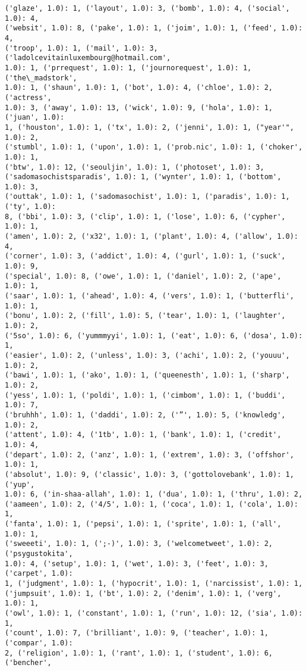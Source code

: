 \documentclass[11pt]{article}
\begin{document}
\begin{Verbatim}[commandchars=\\\{\}]
('glaze', 1.0): 1, ('layout', 1.0): 3, ('bomb', 1.0): 4, ('social', 1.0): 4,
('websit', 1.0): 8, ('pake', 1.0): 1, ('joim', 1.0): 1, ('feed', 1.0): 4,
('troop', 1.0): 1, ('mail', 1.0): 3, ('ladolcevitainluxembourg@hotmail.com',
1.0): 1, ('prrequest', 1.0): 1, ('journorequest', 1.0): 1, ('the\_madstork',
1.0): 1, ('shaun', 1.0): 1, ('bot', 1.0): 4, ('chloe', 1.0): 2, ('actress',
1.0): 3, ('away', 1.0): 13, ('wick', 1.0): 9, ('hola', 1.0): 1, ('juan', 1.0):
1, ('houston', 1.0): 1, ('tx', 1.0): 2, ('jenni', 1.0): 1, ("year'", 1.0): 2,
('stumbl', 1.0): 1, ('upon', 1.0): 1, ('prob.nic', 1.0): 1, ('choker', 1.0): 1,
('btw', 1.0): 12, ('seouljin', 1.0): 1, ('photoset', 1.0): 3,
('sadomasochistsparadis', 1.0): 1, ('wynter', 1.0): 1, ('bottom', 1.0): 3,
('outtak', 1.0): 1, ('sadomasochist', 1.0): 1, ('paradis', 1.0): 1, ('ty', 1.0):
8, ('bbi', 1.0): 3, ('clip', 1.0): 1, ('lose', 1.0): 6, ('cypher', 1.0): 1,
('amen', 1.0): 2, ('x32', 1.0): 1, ('plant', 1.0): 4, ('allow', 1.0): 4,
('corner', 1.0): 3, ('addict', 1.0): 4, ('gurl', 1.0): 1, ('suck', 1.0): 9,
('special', 1.0): 8, ('owe', 1.0): 1, ('daniel', 1.0): 2, ('ape', 1.0): 1,
('saar', 1.0): 1, ('ahead', 1.0): 4, ('vers', 1.0): 1, ('butterfli', 1.0): 1,
('bonu', 1.0): 2, ('fill', 1.0): 5, ('tear', 1.0): 1, ('laughter', 1.0): 2,
('5so', 1.0): 6, ('yummmyyi', 1.0): 1, ('eat', 1.0): 6, ('dosa', 1.0): 1,
('easier', 1.0): 2, ('unless', 1.0): 3, ('achi', 1.0): 2, ('youuu', 1.0): 2,
('bawi', 1.0): 1, ('ako', 1.0): 1, ('queenesth', 1.0): 1, ('sharp', 1.0): 2,
('yess', 1.0): 1, ('poldi', 1.0): 1, ('cimbom', 1.0): 1, ('buddi', 1.0): 7,
('bruhhh', 1.0): 1, ('daddi', 1.0): 2, ('”', 1.0): 5, ('knowledg', 1.0): 2,
('attent', 1.0): 4, ('1tb', 1.0): 1, ('bank', 1.0): 1, ('credit', 1.0): 4,
('depart', 1.0): 2, ('anz', 1.0): 1, ('extrem', 1.0): 3, ('offshor', 1.0): 1,
('absolut', 1.0): 9, ('classic', 1.0): 3, ('gottolovebank', 1.0): 1, ('yup',
1.0): 6, ('in-shaa-allah', 1.0): 1, ('dua', 1.0): 1, ('thru', 1.0): 2,
('aameen', 1.0): 2, ('4/5', 1.0): 1, ('coca', 1.0): 1, ('cola', 1.0): 1,
('fanta', 1.0): 1, ('pepsi', 1.0): 1, ('sprite', 1.0): 1, ('all', 1.0): 1,
('sweeeti', 1.0): 1, (';-)', 1.0): 3, ('welcometweet', 1.0): 2, ('psygustokita',
1.0): 4, ('setup', 1.0): 1, ('wet', 1.0): 3, ('feet', 1.0): 3, ('carpet', 1.0):
1, ('judgment', 1.0): 1, ('hypocrit', 1.0): 1, ('narcissist', 1.0): 1,
('jumpsuit', 1.0): 1, ('bt', 1.0): 2, ('denim', 1.0): 1, ('verg', 1.0): 1,
('owl', 1.0): 1, ('constant', 1.0): 1, ('run', 1.0): 12, ('sia', 1.0): 1,
('count', 1.0): 7, ('brilliant', 1.0): 9, ('teacher', 1.0): 1, ('compar', 1.0):
2, ('religion', 1.0): 1, ('rant', 1.0): 1, ('student', 1.0): 6, ('bencher',

\end{Verbatim}
\end{document}

